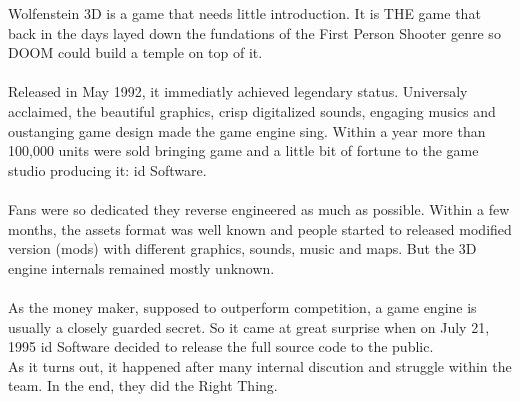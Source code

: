 Wolfenstein 3D is a game that needs little introduction. It is THE game that back in the days layed down the fundations of the First Person Shooter genre so DOOM could build a temple on top of it.\\
\\
Released in May 1992, it immediatly achieved legendary status. Universaly acclaimed, the beautiful graphics, crisp digitalized sounds, engaging musics and oustanging game design made the game engine sing. Within a year more than 100,000 units were sold bringing game and a little bit of fortune to the game studio producing it: id Software.\\
\\
Fans were so dedicated they reverse engineered as much as possible. Within a few months, the assets format was well known and people started to released modified version (mods) with different graphics, sounds, music and maps. But the 3D engine internals remained mostly unknown.\\
\\
As the money maker, supposed to outperform competition, a game engine is usually a closely guarded secret. So it came at great surprise when on July 21, 1995 id Software decided to release the full source code to the public.
\\

As it turns out, it happened after many internal discution and struggle within the team. In the end, they did the Right Thing. 

